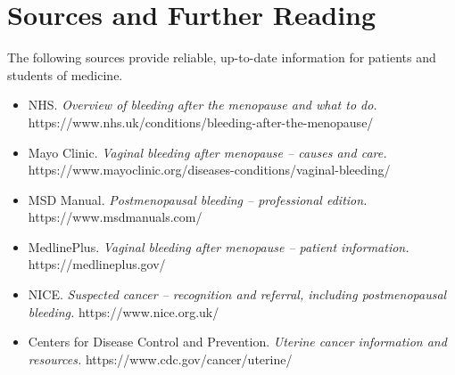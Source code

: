 \section*{Sources and Further Reading}
The following sources provide reliable, up-to-date information for patients and students of medicine.

\begin{itemize}
    \item NHS. \textit{Overview of bleeding after the menopause and what to do.} https://www.nhs.uk/conditions/bleeding-after-the-menopause/
    \item Mayo Clinic. \textit{Vaginal bleeding after menopause -- causes and care.} https://www.mayoclinic.org/diseases-conditions/vaginal-bleeding/
    \item MSD Manual. \textit{Postmenopausal bleeding -- professional edition.} https://www.msdmanuals.com/
    \item MedlinePlus. \textit{Vaginal bleeding after menopause -- patient information.} https://medlineplus.gov/
    \item NICE. \textit{Suspected cancer -- recognition and referral, including postmenopausal bleeding.} https://www.nice.org.uk/
    \item Centers for Disease Control and Prevention. \textit{Uterine cancer information and resources.} https://www.cdc.gov/cancer/uterine/
\end{itemize}
